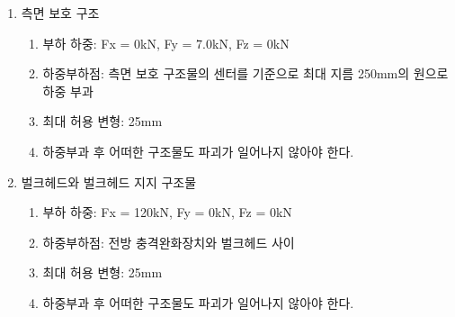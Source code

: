 \documentclass[final,a4paper,10pt]{report}
\begin{document}
\begin{enumerate}
\begin{enumerate}
\begin{enumerate}
        \end{enumerate}
      \item\label{rule:formula-technical.alternative-materials.load-cases.side-impact-structure} 측면 보호 구조
        \begin{enumerate}
          \item\label{rule:formula-technical.alternative-materials.load-cases.side-impact-structure.applied-load} 부하 하중: Fx = 0kN, Fy = 7.0kN, Fz = 0kN
          \item\label{rule:formula-technical.alternative-materials.load-cases.side-impact-structure.load-point} 하중부하점: 측면 보호 구조물의 센터를 기준으로 최대 지름 250mm의 원으로 하중 부과
          \item\label{rule:formula-technical.alternative-materials.load-cases.side-impact-structure.max-deformation-25mm} 최대 허용 변형: 25mm
          \item\label{rule:formula-technical.alternative-materials.load-cases.side-impact-structure.no-structural-failure} 하중부과 후 어떠한 구조물도 파괴가 일어나지 않아야 한다.
        \end{enumerate}
      \item\label{rule:formula-technical.alternative-materials.load-cases.bulkhead} 벌크헤드와 벌크헤드 지지 구조물
        \begin{enumerate}
          \item\label{rule:formula-technical.alternative-materials.load-cases.bulkhead.applied-load} 부하 하중: Fx = 120kN, Fy = 0kN, Fz = 0kN
          \item\label{rule:formula-technical.alternative-materials.load-cases.bulkhead.load-point} 하중부하점: 전방 충격완화장치와 벌크헤드 사이
          \item\label{rule:formula-technical.alternative-materials.load-cases.bulkhead.max-deformation-25mm} 최대 허용 변형: 25mm
          \item\label{rule:formula-technical.alternative-materials.load-cases.bulkhead.no-structural-failure} 하중부과 후 어떠한 구조물도 파괴가 일어나지 않아야 한다.
        \end{enumerate}
    \end{enumerate}


\end{enumerate}
\end{document}
